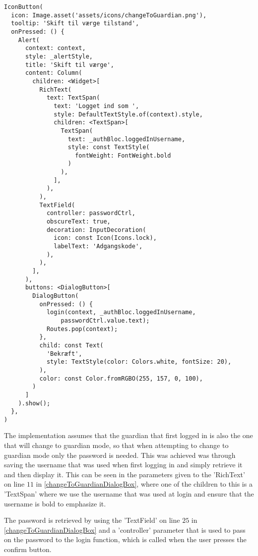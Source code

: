 \lstset{
  caption=Dialog box for confirming password,
  label=changeToGuardianDialogBox
}

\begin{lstlisting}
IconButton(
  icon: Image.asset('assets/icons/changeToGuardian.png'),
  tooltip: 'Skift til værge tilstand',
  onPressed: () {
    Alert(
      context: context,
      style: _alertStyle,
      title: 'Skift til værge',
      content: Column(
        children: <Widget>[
          RichText(
            text: TextSpan(
              text: 'Logget ind som ',
              style: DefaultTextStyle.of(context).style,
              children: <TextSpan>[
                TextSpan(
                  text: _authBloc.loggedInUsername,
                  style: const TextStyle(
                    fontWeight: FontWeight.bold
                  )
                ),
              ],
            ),
          ),
          TextField(
            controller: passwordCtrl,
            obscureText: true,
            decoration: InputDecoration(
              icon: const Icon(Icons.lock),
              labelText: 'Adgangskode',
            ),
          ),
        ],
      ),
      buttons: <DialogButton>[
        DialogButton(
          onPressed: () {
            login(context, _authBloc.loggedInUsername,
                passwordCtrl.value.text);
            Routes.pop(context);
          },
          child: const Text(
            'Bekræft',
            style: TextStyle(color: Colors.white, fontSize: 20),
          ),
          color: const Color.fromRGBO(255, 157, 0, 100),
        )
      ]
    ).show();
  },
)
\end{lstlisting}

The implementation assumes that the guardian that first logged in is also the one that will change to guardian mode, so that when attempting to change to guardian mode only the password is needed.
This was achieved was through saving the username that was used when first logging in and simply retrieve it and then display it. 
This can be seen in the parameters given to the 'RichText' on line $11$ in \autoref{changeToGuardianDialogBox}, where one of the children to this is a 'TextSpan' where we use the username that was used at login and ensure that the username is bold to emphasize it.

The password is retrieved by using the 'TextField' on line $25$ in \autoref{changeToGuardianDialogBox} and a 'controller' parameter that is used to pass on the password to the login function, which is called when the user presses the confirm button.

